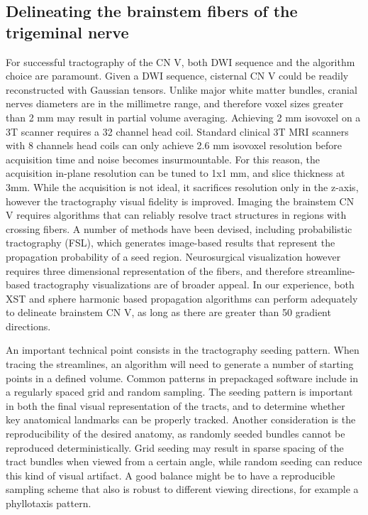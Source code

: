 \subsection{Delineating the brainstem fibers of the trigeminal nerve}

For successful tractography of the CN V, both DWI sequence and the algorithm choice are paramount. Given a DWI sequence, cisternal CN V could be readily reconstructed with Gaussian tensors. Unlike major white matter bundles, cranial nerves diameters are in the millimetre range, and therefore voxel sizes greater than 2 mm may result in partial volume averaging. Achieving 2 mm isovoxel on a 3T scanner requires a 32 channel head coil. Standard clinical 3T MRI scanners with 8 channels head coils can only achieve 2.6 mm isovoxel resolution before acquisition time and noise becomes insurmountable. For this reason, the acquisition in-plane resolution can be tuned to 1x1 mm, and slice thickness at 3mm. While the acquisition is not ideal, it sacrifices resolution only in the z-axis, however the tractography visual fidelity is improved. 
Imaging the brainstem CN V requires algorithms that can reliably resolve tract structures in regions with crossing fibers. A number of methods have been devised, including probabilistic tractography (FSL)\cite{Behrens2007}, which generates image-based results that represent the propagation probability of a seed region. Neurosurgical visualization however requires three dimensional representation of the fibers, and therefore streamline-based tractography visualizations are of broader appeal. In our experience, both XST and sphere harmonic based propagation algorithms can perform adequately to delineate brainstem CN V, as long as there are greater than 50 gradient directions. 

An important technical point consists in the tractography seeding pattern. When tracing the streamlines, an algorithm will need to generate a number of starting points in a defined volume. Common patterns in prepackaged software include in a regularly spaced grid and random sampling. The seeding pattern is important in both the final visual representation of the tracts, and to determine whether key anatomical landmarks can be properly tracked. Another consideration is the reproducibility of the desired anatomy, as randomly seeded bundles cannot be reproduced deterministically. Grid seeding may result in sparse spacing of the tract bundles when viewed from a certain angle, while random seeding can reduce this kind of visual artifact. A good balance might be to have a reproducible sampling scheme that also is robust to different viewing directions, for example a phyllotaxis pattern.

